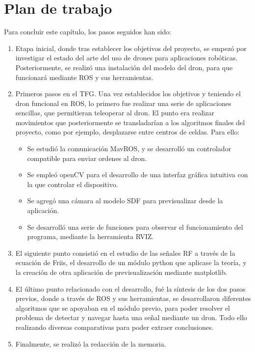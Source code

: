 \section{Plan de trabajo}
\label{sec:plantrabajo}

Para concluir este capítulo, los pasos seguidos han sido:

\begin{enumerate}
	\item Etapa inicial, donde tras establecer los objetivos del proyecto, se empezó por investigar el estado del arte del uso de drones para aplicaciones robóticas. Posteriormente, se realizó una instalación del modelo del dron, para que funcionará mediante ROS y sus herramientas. 
	\item Primeros pasos en el \ac{TFG}. Una vez establecidos los objetivos y teniendo el dron funcional en ROS, lo primero fue realizar una serie de aplicaciones sencillas, que permitieran teleoperar al dron. El punto era realizar movimientos que posteriormente se transladarían a los algoritmos finales del proyecto, como por ejemplo, desplazarse entre centros de celdas. Para ello:
	\begin{itemize}
		\item Se estudió la comunicación MavROS, y se desarrolló un controlador compatible para enviar ordenes al dron.
		\item Se empleó openCV para el desarrollo de una interfaz gráfica intuitiva con la que controlar el dispositivo.
		\item Se agregó una cámara al modelo SDF para previsualizar desde la aplicación.
		\item Se desarrolló una serie de funciones para observar el funcionamiento del programa, mediante la herramienta RVIZ.
    \end{itemize}
	\item El siguiente punto consistió en el estudio de las señales \ac{RF} a través de la ecuación de Friis, el desarrollo de un módulo python que aplicase la teoría, y la creación de otra aplicación de previsualización mediante matplotlib.
	\item El último punto relacionado con el desarrollo, fué la síntesis de los dos pasos previos, donde a través de \ac{ROS} y sus herramientas, se desarrollaron diferentes algoritmos que se apoyaban en el módulo previo, para poder resolver el problema de detectar y navegar hasta una señal mediante un dron. Todo ello realizando diversas comparativas para poder extraer conclusiones.
	\item Finalmente, se realizó la redacción de la memoria.
\end{enumerate}